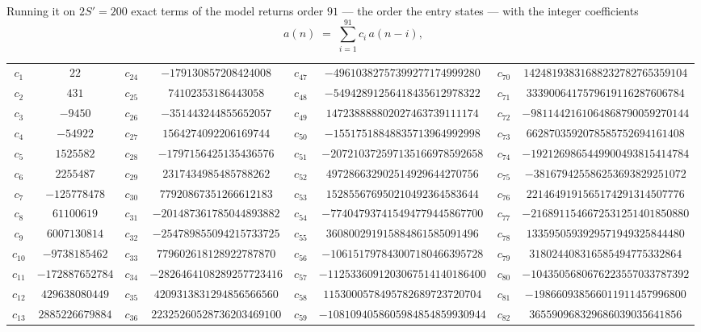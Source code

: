 \documentclass[11pt,a4paper]{article}
\theoremstyle{plain}
\theoremstyle{definition}
\begin{document}
Running it on $2S'=200$ exact terms of the model returns order $91$ --- the order the
entry states --- with the integer coefficients
\[
a(n)\;=\;\sum_{i=1}^{91}c_i\,a(n-i),
\]
\begin{center}\small
\begin{tabular}{cccccccc}
$c_{1}$ & $22$ & $c_{24}$ & $-179130857208424008$ & $c_{47}$ & $-49610382757399277174999280$ & $c_{70}$ & $14248193831688232782765359104$ \\
$c_{2}$ & $431$ & $c_{25}$ & $74102353186443058$ & $c_{48}$ & $-54942891256418435612978322$ & $c_{71}$ & $3339006417579619116287606784$ \\
$c_{3}$ & $-9450$ & $c_{26}$ & $-351443244855652057$ & $c_{49}$ & $147238888802027463739111174$ & $c_{72}$ & $-9811442161064868790059270144$ \\
$c_{4}$ & $-54922$ & $c_{27}$ & $1564274092206169744$ & $c_{50}$ & $-15517518848835713964992998$ & $c_{73}$ & $6628703592078585752694161408$ \\
$c_{5}$ & $1525582$ & $c_{28}$ & $-1797156425135436576$ & $c_{51}$ & $-207210372597135166978592658$ & $c_{74}$ & $-1921269865449900493815414784$ \\
$c_{6}$ & $2255487$ & $c_{29}$ & $2317434985485788262$ & $c_{52}$ & $497286632902514929644270756$ & $c_{75}$ & $-381679425586253693829251072$ \\
$c_{7}$ & $-125778478$ & $c_{30}$ & $77920867351266612183$ & $c_{53}$ & $152855676950210492364583644$ & $c_{76}$ & $2214649191565174291314507776$ \\
$c_{8}$ & $61100619$ & $c_{31}$ & $-201487361785044893882$ & $c_{54}$ & $-774047937415494779445867700$ & $c_{77}$ & $-2168911546672531251401850880$ \\
$c_{9}$ & $6007130814$ & $c_{32}$ & $-254789855094215733725$ & $c_{55}$ & $360800291915884861585091496$ & $c_{78}$ & $1335950593929571949325844480$ \\
$c_{10}$ & $-9738185462$ & $c_{33}$ & $779602618128922787870$ & $c_{56}$ & $-106151797843007180466395728$ & $c_{79}$ & $318024408316585494775332864$ \\
$c_{11}$ & $-172887652784$ & $c_{34}$ & $-2826464108289257723416$ & $c_{57}$ & $-1125336091203067514140186400$ & $c_{80}$ & $-1043505680676223557033787392$ \\
$c_{12}$ & $429638080449$ & $c_{35}$ & $4209313831294856566560$ & $c_{58}$ & $1153000578495782689723720704$ & $c_{81}$ & $-198660938566011911457996800$ \\
$c_{13}$ & $2885226679884$ & $c_{36}$ & $22325260528736203469100$ & $c_{59}$ & $-1081094058605984854859930944$ & $c_{82}$ & $365590968329686039035641856$ \\

\end{tabular}
\end{center}
\end{document}
